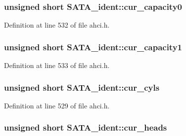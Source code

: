 \subsubsection[{\texorpdfstring{cur\+\_\+capacity0}{cur_capacity0}}]{\setlength{\rightskip}{0pt plus 5cm}unsigned short S\+A\+T\+A\+\_\+ident\+::cur\+\_\+capacity0}\hypertarget{structSATA__ident_af99cde338deece51a862fd3df0732d16}{}\label{structSATA__ident_af99cde338deece51a862fd3df0732d16}


Definition at line 532 of file ahci.\+h.

\subsubsection[{\texorpdfstring{cur\+\_\+capacity1}{cur_capacity1}}]{\setlength{\rightskip}{0pt plus 5cm}unsigned short S\+A\+T\+A\+\_\+ident\+::cur\+\_\+capacity1}\hypertarget{structSATA__ident_ae00faf5e261fb84c826a7862c255e6c2}{}\label{structSATA__ident_ae00faf5e261fb84c826a7862c255e6c2}


Definition at line 533 of file ahci.\+h.

\subsubsection[{\texorpdfstring{cur\+\_\+cyls}{cur_cyls}}]{\setlength{\rightskip}{0pt plus 5cm}unsigned short S\+A\+T\+A\+\_\+ident\+::cur\+\_\+cyls}\hypertarget{structSATA__ident_a5e404662579618edbd9f77571365a993}{}\label{structSATA__ident_a5e404662579618edbd9f77571365a993}


Definition at line 529 of file ahci.\+h.

\subsubsection[{\texorpdfstring{cur\+\_\+heads}{cur_heads}}]{\setlength{\rightskip}{0pt plus 5cm}unsigned short S\+A\+T\+A\+\_\+ident\+::cur\+\_\+heads}\hypertarget{structSATA__ident_a1fe29be2e7d4c125e53a63297e7d6041}{}\label{structSATA__ident_a1fe29be2e7d4c125e53a63297e7d6041}


